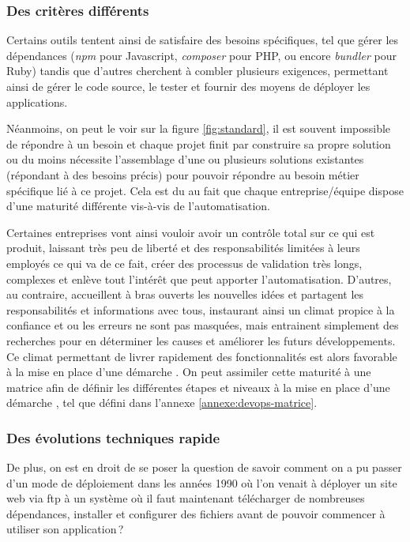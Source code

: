 \subsubsection{Des critères différents}

Certains outils tentent ainsi de satisfaire des besoins spécifiques, tel que gérer les dépendances (\emph{npm} pour Javascript, \emph{composer} pour \gls{PHP}, ou encore \emph{bundler} pour Ruby) tandis que d'autres cherchent à combler plusieurs exigences, permettant ainsi de gérer le code source, le tester et fournir des moyens de déployer les applications.


Néanmoins, on peut le voir sur la figure \ref{fig:standard}, il est souvent impossible de répondre à un besoin  et chaque projet finit par construire sa propre solution ou du moins nécessite l'assemblage d'une ou plusieurs solutions existantes (répondant à des besoins précis) pour pouvoir répondre au besoin métier spécifique lié à ce projet. Cela est du au fait que chaque entreprise/équipe dispose d'une maturité différente vis-à-vis de l'automatisation.

Certaines entreprises vont ainsi vouloir avoir un contrôle total sur ce qui est produit, laissant très peu de liberté et des responsabilités limitées à leurs employés ce qui va de ce fait, créer des processus de validation très longs, complexes et enlève tout l'intérêt que peut apporter l'automatisation. D'autres, au contraire, accueillent à bras ouverts les nouvelles idées et partagent les responsabilités et informations avec tous, instaurant ainsi un climat propice à la confiance et ou les erreurs ne sont pas masquées, mais entrainent simplement des recherches pour en déterminer les causes et améliorer les futurs développements. Ce climat permettant de livrer rapidement des fonctionnalités est alors favorable à la mise en place d'une démarche \devops. On peut assimiler cette maturité à une matrice afin de définir les différentes étapes et niveaux à la mise en place d'une démarche \devops, tel que défini dans l'annexe \ref{annexe:devops-matrice}.

\subsubsection{Des évolutions techniques rapide}

De plus, on est en droit de se poser la question de savoir comment on a pu passer d'un mode de déploiement dans les années 1990 où l'on venait à déployer un site web via \gls{ftp} à un système où il faut maintenant télécharger de nombreuses dépendances, installer et configurer des fichiers avant de pouvoir commencer à utiliser son application ?

